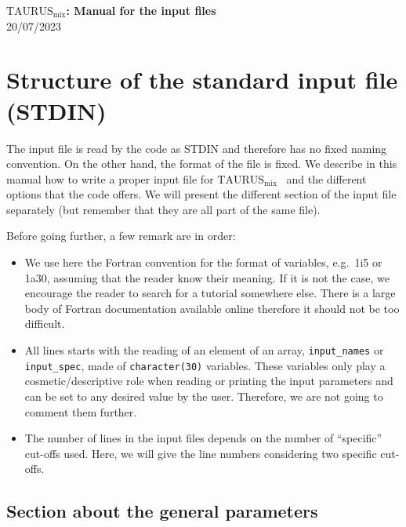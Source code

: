 \documentclass[a4paper,11pt]{article}
\newcommand{\TAURUSmix}{$\text{TAURUS}_{\text{mix}}$}
\newcommand{\ttt}[1]{\texttt{#1}}
\begin{document}
%
% 
\begin{center}
 {\LARGE \textbf{\TAURUSmix: Manual for the input files}} \\[0.20cm]
 {\large 20/07/2023}
\end{center}

%
% 
\section{Structure of the standard input file (STDIN)}

The input file is read by the code as STDIN and therefore has no fixed naming convention. 
On the other hand, the format of the file is fixed. We describe in this manual how to write a proper input file for \TAURUSmix~
and the different options that the code offers.
We will present the different section of the input file separately (but remember that they
are all part of the same file).
 
\noindent Before going further, a few remark are in order:
\begin{itemize}
  \item We use here the Fortran convention for the format of variables, e.g.\ 1i5 or 1a30, assuming that the reader
  know their meaning. If it is not the case, we encourage the reader to search for a tutorial somewhere else.
  There is a large body of Fortran documentation available online therefore it should not be too difficult.

  \item All lines starts with the reading of an element of an array, \ttt{input\_names} or \ttt{input\_spec},
  made of \ttt{character(30)} variables. 
  These variables only play a cosmetic/descriptive role when reading or printing the input parameters and can be
  set to any desired value by the user. Therefore, we are not going to comment them further.

  \item The number of lines in the input files depends on the number of ``specific'' cut-offs used. Here, we will give
  the line numbers considering two specific cut-offs.
\end{itemize}

%
%
\subsection{Section about the general parameters}
\end{document}
